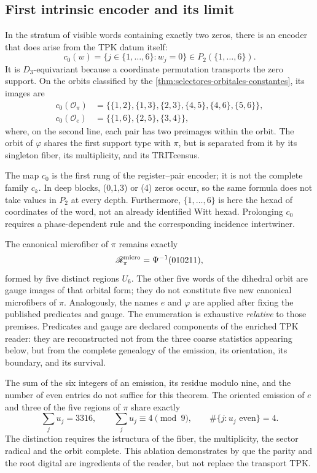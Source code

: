 \subsection{First intrinsic encoder and its limit}

In the stratum of visible words containing exactly two zeros, there is
an encoder that does arise from the TPK datum itself:
\[
 c_0(w)=\{j\in\{1,\ldots,6\}:w_j=0\}
 \in P_2(\{1,\ldots,6\}).
\]
It is \(D_3\)-equivariant because a coordinate permutation transports the zero support. On the orbits classified by the
\cref{thm:selectores-orbitales-constantes}, its images are
\[
\begin{aligned}
 c_0(\mathcal O_\pi)
 &=\{\{1,2\},\{1,3\},\{2,3\},\{4,5\},\{4,6\},\{5,6\}\},\\
 c_0(\mathcal O_e)
 &=\{\{1,6\},\{2,5\},\{3,4\}\},
\end{aligned}
\]
where, on the second line, each pair has two preimages within the orbit.
The orbit of \(\varphi\) shares the first support type with \(\pi\), but
is separated from it by its singleton fiber, its multiplicity, and its TRIT\@ census.

The map \(c_0\) is the first rung of the register--pair encoder; it is not the complete family \(c_k\). In deep blocks, (0,1,3) or (4) zeros occur, so the same formula does not take values in \(P_2\) at every depth. Furthermore, \(\{1,\ldots,6\}\) is here the hexad of coordinates of the word, not an already identified Witt hexad. Prolonging \(c_0\) requires a phase-dependent rule and the corresponding incidence intertwiner.

The canonical microfiber of \(\pi\) remains exactly
\[
 \mathscr R_\pi^{\rm micro}=\Psi^{-1}(010211),
\]
formed by five distinct regions \(U_6\). The other five words of the
dihedral orbit are gauge images of that orbital form; they do not constitute
five new canonical microfibers of \(\pi\). Analogously, the names
\(e\) and \(\varphi\) are applied after fixing the published predicates and gauge.
The enumeration is exhaustive \emph{relative} to those
premises. Predicates and gauge are declared components of the enriched TPK
reader: they are reconstructed not from the three coarse statistics
appearing below, but from the complete genealogy of the emission,
its orientation, its boundary, and its survival.

The sum of the six integers of an emission, its residue modulo nine, and the
number of even entries do not suffice for this theorem. The oriented emission
of \(e\) and three of the five regions of \(\pi\) share exactly
\[
 \sum_j u_j=3316,
 \qquad
 \sum_j u_j\equiv4\pmod9,
 \qquad
 \#\{j:u_j\text{ even}\}=4.
\]
The distinction requires the istructura of the fiber, the multiplicity, the sector
radical and the orbit complete. This ablation demonstrates by que the parity and
the root digital are ingredients of the reader, but not replace the
transport TPK\@.

